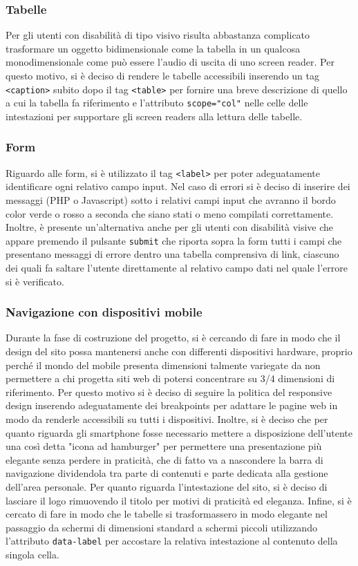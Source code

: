     \subsubsection{Tabelle}
    Per gli utenti con disabilità di tipo visivo risulta abbastanza complicato trasformare un oggetto bidimensionale come la tabella in un qualcosa monodimensionale come può essere l’audio di uscita di uno screen reader. Per questo motivo, si è deciso di rendere le tabelle accessibili inserendo un tag \texttt{<caption>} subito dopo il tag \texttt{<table>} per fornire una breve descrizione di quello a cui la tabella fa riferimento e l'attributo \texttt{scope="col"} nelle celle delle intestazioni per supportare gli screen readers alla lettura delle tabelle.
    \subsubsection{Form}
    Riguardo alle form, si è utilizzato il tag \texttt{<label>} per poter adeguatamente identificare ogni relativo campo input. Nel caso di errori si è deciso di inserire dei messaggi (PHP o Javascript) sotto i relativi campi input che avranno il bordo color verde o rosso a seconda che siano stati o meno compilati correttamente. Inoltre, è presente un'alternativa anche per gli utenti con disabilità visive che appare premendo il pulsante \texttt{submit} che riporta sopra la form tutti i campi che presentano messaggi di errore dentro una tabella comprensiva di link, ciascuno dei quali fa saltare l'utente direttamente al relativo campo dati nel quale l'errore si è verificato.
    \subsubsection{Navigazione con dispositivi mobile}
    Durante la fase di costruzione del progetto, si è cercando di fare in modo che il design del sito possa mantenersi anche con differenti dispositivi hardware, proprio perché il mondo del mobile presenta dimensioni talmente variegate da non permettere a chi progetta siti web di potersi concentrare su 3/4 dimensioni di riferimento. Per questo motivo si è deciso di seguire la politica del responsive design inserendo adeguatamente dei breakpoints per adattare le pagine web in modo da renderle accessibili su tutti i dispositivi. Inoltre, si è deciso che per quanto riguarda gli smartphone fosse necessario mettere a disposizione dell'utente una così detta "icona ad hamburger" per permettere una presentazione più elegante senza perdere in praticità, che di fatto va a nascondere la barra di navigazione dividendola tra parte di contenuti e parte dedicata alla gestione dell'area personale.  Per quanto riguarda l'intestazione del sito, si è deciso di lasciare il logo rimuovendo il titolo per motivi di praticità ed eleganza. Infine, si è cercato di fare in modo che le tabelle si trasformassero in modo elegante nel passaggio da schermi di dimensioni standard a schermi piccoli utilizzando l’attributo \texttt{data-label} per accostare la relativa intestazione al contenuto della singola cella.
